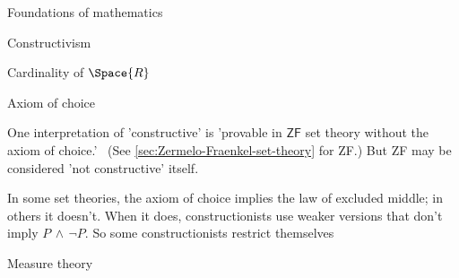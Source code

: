 \begin{plSection}{Foundations of mathematics}
\begin{plSection}{Constructivism}
\begin{plSection}{Cardinality of \texorpdfstring{$\Space{R}$}{R}}
\end{plSection}%
\begin{plSection}{Axiom of choice}
\label{sec:AxiomOfchoice}

One interpretation of 'constructive' is
'provable in $\textsf{ZF}$ set theory without the axiom of 
choice.'~\cite{iep:SetTheory,wiki:AxiomOfChoice}
(See \cref{sec:Zermelo-Fraenkel-set-theory} for \textsf{ZF}.)
But \textsf{ZF} may be considered 'not constructive'
itself.

In some set theories, the axiom of choice implies
the law of excluded middle; in others it doesn't.
When it does, constructionists use weaker versions
that don't imply $P \, \wedge \, \lnot P$.
So some constructionists restrict themselves

\end{plSection}%
\begin{plSection}{Measure theory}
\label{sec:Measure_theory}


\end{plSection}%
\end{plSection}%
\end{plSection}%
 